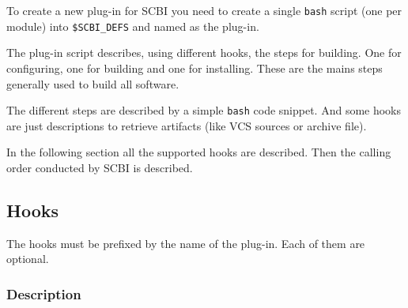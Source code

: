 \documentclass[a4paper,12pt,twoside]{article}
\newcommand{\code}[1]{\texttt{#1}}
\begin{document}
To create a new plug-in for SCBI you need to create a single \code{bash} script (one per module) into \code{\$SCBI\_DEFS} and named as the plug-in.

The plug-in script describes, using different hooks, the steps for building. One for configuring, one for building and one for installing. These are the mains steps generally used to build all software.

The different steps are described by a simple \code{bash} code snippet. And some hooks are just descriptions to retrieve artifacts (like VCS sources or archive file).

In the following section all the supported hooks are described. Then the calling order conducted by SCBI is described.

\subsection{Hooks}

The hooks must be prefixed by the name of the plug-in. Each of them are optional.

\subsubsection{Description}
\end{document}
